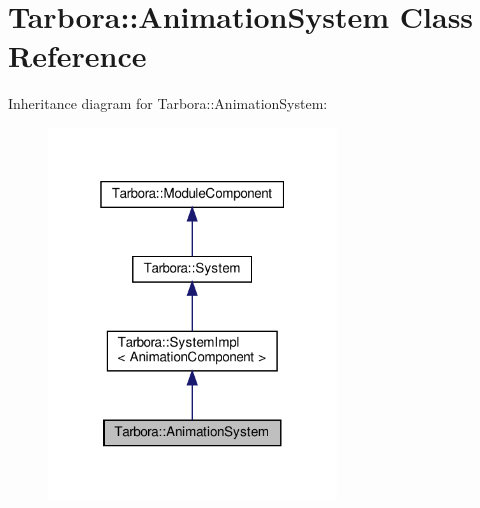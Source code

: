 \hypertarget{classTarbora_1_1AnimationSystem}{}\section{Tarbora\+:\+:Animation\+System Class Reference}
\label{classTarbora_1_1AnimationSystem}


Inheritance diagram for Tarbora\+:\+:Animation\+System\+:\nopagebreak
\begin{figure}[H]
\begin{center}
\leavevmode
\includegraphics[width=217pt]{classTarbora_1_1AnimationSystem__inherit__graph}
\end{center}
\end{figure}



